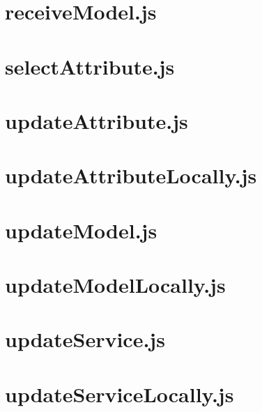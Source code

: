 \documentclass[a4paper,landscape]{report}
\begin{document}
\newpage
\section{receiveModel.js}


\newpage
\section{selectAttribute.js}


\newpage
\section{updateAttribute.js}


\newpage
\section{updateAttributeLocally.js}


\newpage
\section{updateModel.js}


\newpage
\section{updateModelLocally.js}


\newpage
\section{updateService.js}


\newpage
\section{updateServiceLocally.js}

\end{document}
